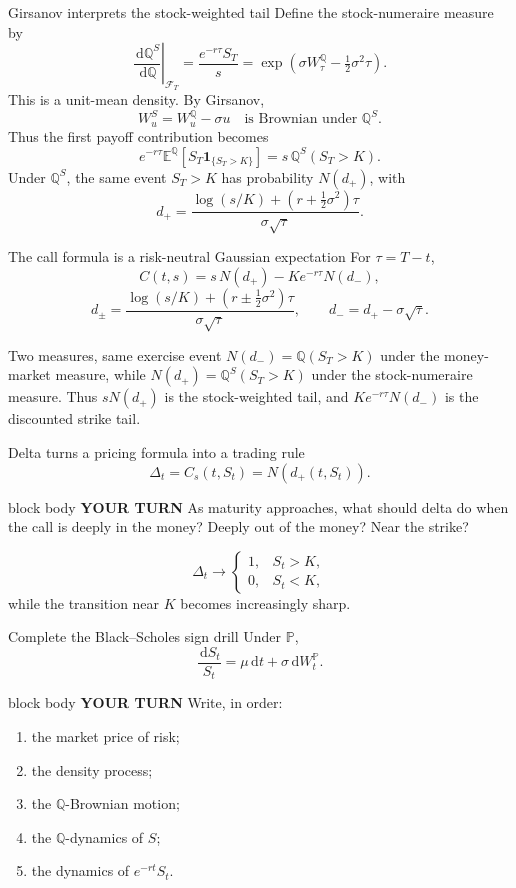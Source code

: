 \documentclass[handout,10pt,aspectratio=169]{beamer}
\newenvironment{pausebox}{\begin{beamercolorbox}[rounded=true,sep=0.8em,wd=\textwidth]{block body}
  \textbf{\color{CourseGold}YOUR TURN}\quad}{\end{beamercolorbox}}
\newcommand{\dd}{\,\mathrm d}
\newcommand{\E}{\mathbb E}
\newcommand{\Pp}{\mathbb P}
\newcommand{\Q}{\mathbb Q}
\newcommand{\cF}{\mathcal F}
\newcommand{\1}{\mathbf 1}
\begin{document}
\begin{frame}{Girsanov interprets the stock-weighted tail}
Define the stock-numeraire measure by
\[
\left.\frac{\dd\Q^{S}}{\dd\Q}\right|_{\cF_T}
=\frac{e^{-r\tau}S_T}{s}
=\exp\!\left(\sigma W_\tau^\Q-\tfrac12\sigma^2\tau\right).
\]
This is a unit-mean density. By Girsanov,
\[
W_u^{S}=W_u^\Q-\sigma u
\quad\text{is Brownian under }\Q^{S}.
\]
Thus the first payoff contribution becomes
\[
e^{-r\tau}\E^\Q[S_T\1_{\{S_T>K\}}]
=s\,\Q^{S}(S_T>K).
\]
Under \(\Q^S\), the same event \(S_T>K\) has probability \(N(d_+)\), with
\[
d_+=\frac{\log(s/K)+(r+\frac12\sigma^2)\tau}{\sigma\sqrt\tau}.
\]
\end{frame}

\begin{frame}{The call formula is a risk-neutral Gaussian expectation}
For \(\tau=T-t\),
\[
C(t,s)=s\,N(d_+)-Ke^{-r\tau}N(d_-),
\]
\[
d_\pm
=\frac{\log(s/K)+(r\pm\frac12\sigma^2)\tau}
{\sigma\sqrt{\tau}},
\qquad d_-=d_+-\sigma\sqrt{\tau}.
\]
\begin{block}{Two measures, same exercise event}
\(N(d_-)=\Q(S_T>K)\) under the money-market measure, while
\(N(d_+)=\Q^S(S_T>K)\) under the stock-numeraire measure. Thus
\(sN(d_+)\) is the stock-weighted tail, and \(Ke^{-r\tau}N(d_-)\) is
the discounted strike tail.
\end{block}
\end{frame}

\begin{frame}{Delta turns a pricing formula into a trading rule}
\[
\boxed{\Delta_t=C_s(t,S_t)=N(d_+(t,S_t)).}
\]
\begin{pausebox}
As maturity approaches, what should delta do when the call is deeply
in the money? Deeply out of the money? Near the strike?
\end{pausebox}

\[
\Delta_t\longrightarrow
\begin{cases}
1,&S_t>K,\\
0,&S_t<K,
\end{cases}
\]
while the transition near \(K\) becomes increasingly sharp.
\end{frame}

\begin{frame}{Complete the Black--Scholes sign drill}
Under \(\Pp\),
\[
\frac{\dd S_t}{S_t}=\mu\dd t+\sigma\dd W_t^\Pp.
\]
\begin{pausebox}
Write, in order:
\begin{enumerate}
  \item the market price of risk;
  \item the density process;
  \item the \(\Q\)-Brownian motion;
  \item the \(\Q\)-dynamics of \(S\);
  \item the dynamics of \(e^{-rt}S_t\).
\end{enumerate}
\end{pausebox}
\end{frame}
\end{document}
